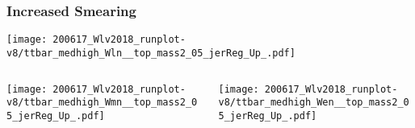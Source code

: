 \documentclass{beamer}
\newcommand{\beginbackup}{
  \newcounter{framenumbervorappendix}
  \setcounter{framenumbervorappendix}{\value{framenumber}}
}
\newcommand{\backupend}{
  \addtocounter{framenumbervorappendix}{-\value{framenumber}}
  \addtocounter{framenumber}{\value{framenumbervorappendix}}
}
\begin{document}
\begin{frame}
  \frametitle{Increased Smearing}
  \centering
  \texttt{[image: 200617\_Wlv2018\_runplot-v8/ttbar\_medhigh\_Wln\_\_top\_mass2\_05\_jerReg\_Up\_.pdf]}
  \begin{columns}
    \begin{column}{0.5\linewidth}
      \centering
      \texttt{[image: 200617\_Wlv2018\_runplot-v8/ttbar\_medhigh\_Wmn\_\_top\_mass2\_05\_jerReg\_Up\_.pdf]}
    \end{column}
    \begin{column}{0.5\linewidth}
      \centering
      \texttt{[image: 200617\_Wlv2018\_runplot-v8/ttbar\_medhigh\_Wen\_\_top\_mass2\_05\_jerReg\_Up\_.pdf]}
    \end{column}
  \end{columns}
\end{frame}

\begin{comment}
\beginbackup

\begin{frame}
  \centering
    {\Huge \bf\sffamily Backup Slides}
\end{frame}



\backupend
\end{comment}
\end{document}
